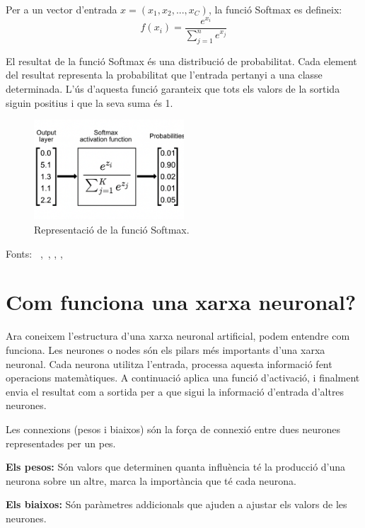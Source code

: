 \begin{enumerate}
    Per a un vector d'entrada $x =  \left( x_1,x_2 , ... , x_C \right)$, la funció Softmax es defineix:
    $$f(x_i) = \frac{e^{x_i}}{\sum_{j=1}^{n} e^{x_j}}$$

    El resultat de la funció Softmax és una distribució de probabilitat. Cada element del resultat representa la probabilitat que l'entrada pertanyi a una classe determinada. L'ús d'aquesta funció garanteix que tots els valors de la sortida siguin positius i que la seva suma és 1.

    \begin{figure}[h!]
        \centering
        \includegraphics[width=0.5\textwidth]{./figures/representacio_Softmax.png}
        \caption{Representació de la funció Softmax.~\cite{Img2_softmax}}
    \end{figure}
\end{enumerate}

Fonts: ~\cite{Hidden_layer},~\cite{Jacar}, \cite{FuncioD'activacio}, \cite{Softmax}, \cite{datacamp}

\section{Com funciona una xarxa neuronal?}\label{sec:3.8}

Ara coneixem l'estructura d'una xarxa neuronal artificial, podem entendre com funciona. Les neurones o nodes són els pilars més importants d'una xarxa neuronal. Cada neurona utilitza l'entrada, processa aquesta informació fent operacions matemàtiques. A continuació aplica una funció d'activació, i finalment envia el resultat com a sortida per a que sigui la informació d'entrada d'altres neurones.

Les connexions (pesos i biaixos) són la força de connexió entre dues neurones representades per un pes.

\textbf{Els pesos:} Són valors que determinen quanta influència té la producció d'una neurona sobre un altre, marca la importància que té cada neurona.

\textbf{Els biaixos:} Són paràmetres addicionals que ajuden a ajustar els valors de les neurones.

